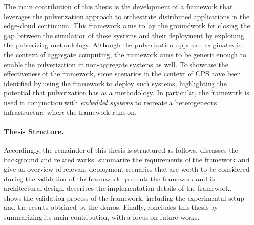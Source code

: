 The main contribution of this thesis is the development of a framework that leverages the pulverization approach to orchestrate distributed
applications in the edge-cloud continuum.
This framework aims to lay the groundwork for closing the gap between the simulation of these systems and their deployment by exploiting the
pulverizing methodology.
Although the pulverization approach originates in the context of aggregate computing, the framework aims to be generic enough to enable the
pulverization in non-aggregate systems as well.
To showcase the effectiveness of the framework, some scenarios in the context of CPS have been identified by using the framework to deploy such
systems, highlighting the potential that pulverization has as a methodology.
In particular, the framework is used in conjunction with \emph{embedded systems} to recreate a heterogeneous infrastructure where the framework
runs on.

%
\paragraph{Thesis Structure.} %
%
Accordingly, the remainder of this thesis is structured as follows.
%
 discusses the background and related works.
%
 summarize the requirements of the framework and give an overview of relevant deployment scenarios that are worth
to be considered during the validation of the framework.
%
 presents the framework and its architectural design.
%
 describes the implementation details of the framework.
%
 shows the validation process of the framework, including the experimental setup and the results obtained by the demos.
%
Finally,  concludes this thesis by summarizing its main contribution, with a focus on future works.